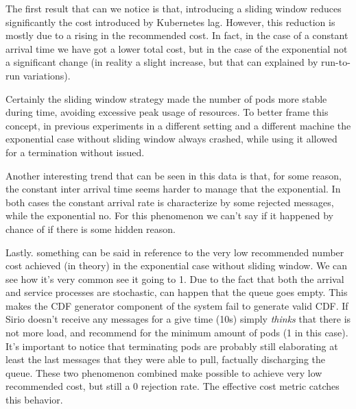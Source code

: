 The first result that can we notice is that, introducing a sliding window reduces significantly the cost introduced by Kubernetes lag. However, this reduction is mostly due to a rising in the recommended cost. In fact, in the case of a constant arrival time we have got a lower total cost, but in the case of the exponential not a significant change (in reality a slight increase, but that can explained by run-to-run variations).

Certainly the sliding window strategy made the number of pods more stable during time, avoiding excessive peak usage of resources. To better frame this concept, in previous experiments in a different setting and a different machine the exponential case without sliding window always crashed, while using it allowed for a termination without issued.

Another interesting trend that can be seen in this data is that, for some reason, the constant inter arrival time seems harder to manage that the exponential. In both cases the constant arrival rate is characterize by some rejected messages, while the exponential no. For this phenomenon we can't say if it happened by chance of if there is some hidden reason.

Lastly. something can be said in reference to the very low recommended number cost achieved (in theory) in the exponential case without sliding window. We can see how it's very common see it going to 1. Due to the fact that both the arrival and service processes are stochastic, can happen that the queue goes empty. This makes the CDF generator component of the system fail to generate valid CDF. If Sirio doesn't receive any messages for a give time (10s) simply \textit{thinks} that there is not more load, and recommend for the minimum amount of pods (1 in this case). It's important to notice that terminating pods are probably still elaborating at least the last messages that they were able to pull, factually discharging the queue. These two phenomenon combined make possible to achieve very low recommended cost, but still a 0 rejection rate. The effective cost metric catches this behavior.

